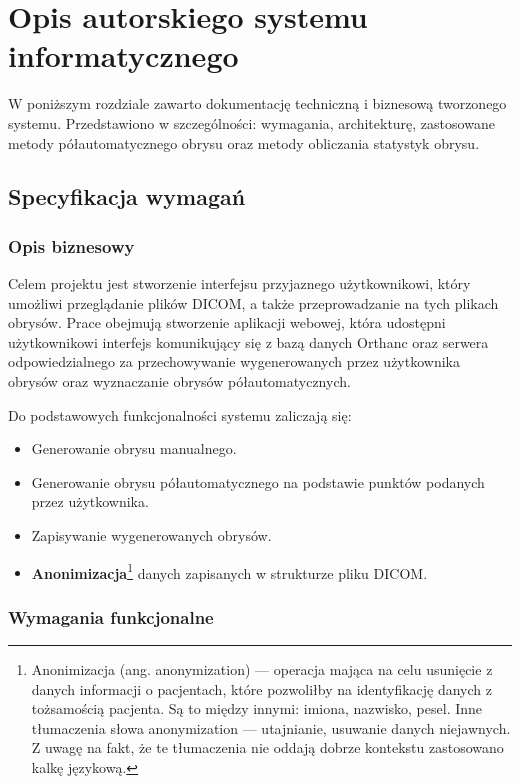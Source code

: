 \documentclass[a4paper,11pt,twoside]{report}
\theoremstyle{definition}
\begin{document}
\chapter {Opis autorskiego systemu informatycznego}

W poniższym rozdziale zawarto dokumentację techniczną i biznesową tworzonego systemu. Przedstawiono w szczególności: wymagania, architekturę, zastosowane metody półautomatycznego obrysu oraz metody obliczania statystyk obrysu.

\section {Specyfikacja wymagań}

\subsection {Opis biznesowy}

Celem projektu jest stworzenie interfejsu przyjaznego użytkownikowi, który umożliwi przeglądanie plików DICOM, a także przeprowadzanie na tych plikach obrysów. Prace obejmują stworzenie aplikacji webowej, która udostępni użytkownikowi interfejs komunikujący się z bazą danych Orthanc oraz serwera odpowiedzialnego za przechowywanie wygenerowanych przez użytkownika obrysów oraz wyznaczanie obrysów półautomatycznych. 

Do podstawowych funkcjonalności systemu zaliczają się:
\begin{itemize}[noitemsep]
\item Generowanie obrysu manualnego.
\item Generowanie obrysu półautomatycznego na podstawie punktów podanych przez użytkownika.
\item Zapisywanie wygenerowanych obrysów.
\item \textbf {Anonimizacja}\footnote {Anonimizacja (ang. anonymization) --- operacja mająca na celu usunięcie z danych informacji o pacjentach, które pozwoliłby na identyfikację danych z tożsamością pacjenta. Są to między innymi: imiona, nazwisko, pesel. Inne tłumaczenia słowa anonymization --- utajnianie, usuwanie danych niejawnych. Z uwagę na fakt, że te tłumaczenia nie oddają dobrze kontekstu zastosowano kalkę językową.} danych zapisanych w strukturze pliku DICOM.
\end{itemize}

\subsection {Wymagania funkcjonalne}
\end{document}
